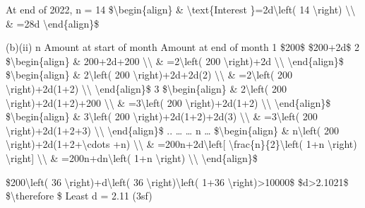 At end of 2022, n = 14 \$\textbackslash begin\{align\} \& \textbackslash text\{Interest
\}=2d\textbackslash left( 14 \textbackslash right) \textbackslash\textbackslash{}
\& =28d \textbackslash end\{align\}\$ 

(b)(ii) n Amount at start of month Amount at end of month 1 \$200\$
\$200+2d\$ 2 \$\textbackslash begin\{align\} \& 200+2d+200 \textbackslash\textbackslash{}
\& =2\textbackslash left( 200 \textbackslash right)+2d \textbackslash\textbackslash{}
\textbackslash end\{align\}\$ \$\textbackslash begin\{align\} \&
2\textbackslash left( 200 \textbackslash right)+2d+2d(2) \textbackslash\textbackslash{}
\& =2\textbackslash left( 200 \textbackslash right)+2d(1+2) \textbackslash\textbackslash{}
\textbackslash end\{align\}\$ 3 \$\textbackslash begin\{align\}
\& 2\textbackslash left( 200 \textbackslash right)+2d(1+2)+200 \textbackslash\textbackslash{}
\& =3\textbackslash left( 200 \textbackslash right)+2d(1+2) \textbackslash\textbackslash{}
\textbackslash end\{align\}\$ \$\textbackslash begin\{align\} \&
3\textbackslash left( 200 \textbackslash right)+2d(1+2)+2d(3) \textbackslash\textbackslash{}
\& =3\textbackslash left( 200 \textbackslash right)+2d(1+2+3) \textbackslash\textbackslash{}
\textbackslash end\{align\}\$ .. \dots{} \dots{} n \dots{} \$\textbackslash begin\{align\}
\& n\textbackslash left( 200 \textbackslash right)+2d(1+2+\textbackslash cdots
+n) \textbackslash\textbackslash{} \& =200n+2d\textbackslash left{[}
\textbackslash frac\{n\}\{2\}\textbackslash left( 1+n \textbackslash right)
\textbackslash right{]} \textbackslash\textbackslash{} \& =200n+dn\textbackslash left(
1+n \textbackslash right) \textbackslash\textbackslash{} \textbackslash end\{align\}\$

\$200\textbackslash left( 36 \textbackslash right)+d\textbackslash left(
36 \textbackslash right)\textbackslash left( 1+36 \textbackslash right)>10000\$
\$d>2.1021\$ \$\textbackslash therefore \$ Least d = 2.11 (3sf)